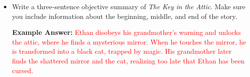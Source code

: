 \documentclass[12pt]{article}
\begin{document}
\vspace{1em}

\begin{tcolorbox}[colframe=black!60, colback=white, 
coltitle=black, colbacktitle=black!15, fonttitle=\bfseries\Large, 
title=Exit Ticket, halign title=center]
\textbf{}

\begin{itemize}
    \item Write a three-sentence objective summary of \textit{The Key in the Attic}. Make sure you include information about the beginning, middle, and end of the story.
    \vspace{2em}

    \textbf{Example Answer:}  
    \textcolor{red}{
    Ethan disobeys his grandmother’s warning and unlocks the attic, where he finds a mysterious mirror. When he touches the mirror, he is transformed into a black cat, trapped by magic. His grandmother later finds the shattered mirror and the cat, realizing too late that Ethan has been cursed.}
\end{itemize}
\end{tcolorbox}
\end{document}
